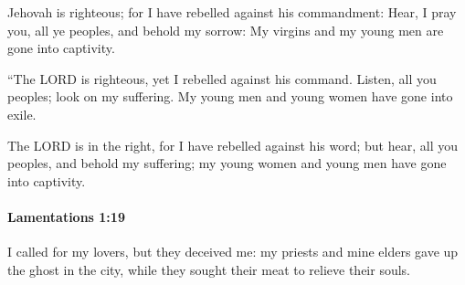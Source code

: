 			\begin{versebox}
					\item[BHS] 
					\item[LXX] 
					\item[ASV] Jehovah is righteous; for I have rebelled against his commandment: Hear, I pray you, all ye peoples, and behold my sorrow: My virgins and my young men are gone into captivity.
					\item[NIV] “The LORD is righteous, yet I rebelled against his command. Listen, all you peoples; look on my suffering. My young men and young women have gone into exile.
					\item[NRSV] The LORD is in the right, for I have rebelled against his word; but hear, all you peoples, and behold my suffering; my young women and young men have gone into captivity.
			\end{versebox}

		\paragraph{Lamentations 1:19} %
			\label{LAMENTATIONS-1-19}

			I called for my lovers, but they deceived me: my priests and mine elders gave up the ghost in the city, while they sought their meat to relieve their souls.

